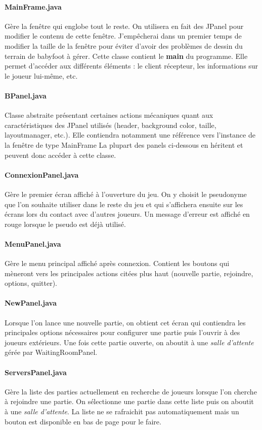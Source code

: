 \documentclass[a4paper,12pt]{report}
\begin{document}
\paragraph{MainFrame.java}
Gère la fenêtre qui englobe tout le reste. On utilisera en fait des JPanel pour modifier le contenu de cette fenêtre. J'empêcherai dans un premier temps de modifier la taille de la fenêtre pour éviter d'avoir des problèmes de dessin du terrain de babyfoot à gérer. Cette classe contient le \textbf{main} du programme. Elle permet d'accéder aux différents éléments : le client récepteur, les informations sur le joueur lui-même, etc.
\paragraph{BPanel.java}
Classe abstraite présentant certaines actions mécaniques quant aux caractéristiques des JPanel utilisés (header, background color, taille, layoutmanager, etc.). Elle contiendra notamment une référence vers l'instance de la fenêtre de type MainFrame La plupart des panels ci-dessous en héritent et peuvent donc accéder à cette classe.
\paragraph{ConnexionPanel.java}
Gère le premier écran affiché à l'ouverture du jeu. On y choisit le pseudonyme que l'on souhaite utiliser dans le reste du jeu et qui s'affichera ensuite sur les écrans lors du contact avec d'autres joueurs. Un message d'erreur est affiché en rouge lorsque le pseudo est déjà utilisé.
\paragraph{MenuPanel.java}
Gère le menu principal affiché après connexion. Contient les boutons qui mèneront vers les principales actions citées plus haut (nouvelle partie, rejoindre, options, quitter).
\paragraph{NewPanel.java}
Lorsque l'on lance une nouvelle partie, on obtient cet écran qui contiendra les principales options nécessaires pour configurer une partie puis l'ouvrir à des joueurs extérieurs. Une fois cette partie ouverte, on aboutit à une \emph{salle d'attente} gérée par WaitingRoomPanel.
\paragraph{ServersPanel.java}
Gère la liste des parties actuellement en recherche de joueurs lorsque l'on cherche à rejoindre une partie. On sélectionne une partie dans cette liste puis on aboutit à une \emph{salle d'attente}. La liste ne se rafraichit pas automatiquement mais un bouton est disponible en bas de page pour le faire.
\end{document}
